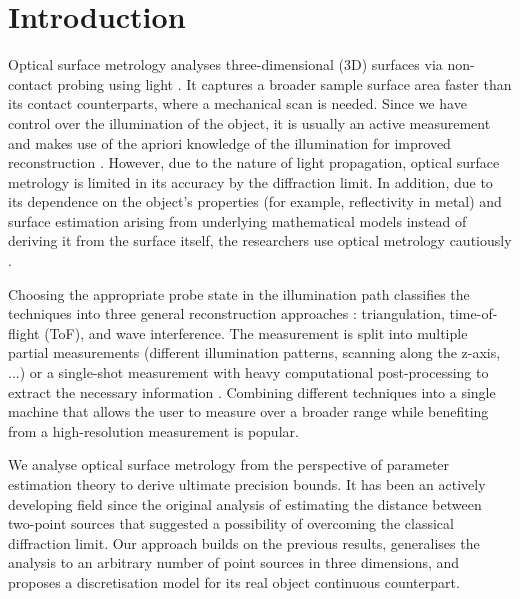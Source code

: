 \documentclass[reprint,amsmath,amssymb,aps,pra,floatfix]{revtex4-2}
\begin{document}
\maketitle

\section{\label{sec:intro} Introduction}
Optical surface metrology analyses three-dimensional (3D) surfaces via non-contact probing using light \cite{leach2020advances,catalucci2022optical}. It captures a broader sample surface area faster than its contact counterparts, where a mechanical scan is needed. Since we have control over the illumination of the object, it is usually an active measurement and makes use of the apriori knowledge of the illumination for improved reconstruction  \cite{hocken2005optical}. However, due to the nature of light propagation, optical surface metrology is limited in its accuracy by the diffraction limit. In addition, due to its dependence on the object's properties (for example, reflectivity in metal) and surface estimation arising from underlying mathematical models instead of deriving it from the surface itself, the researchers use optical metrology cautiously \cite{mathia2011recent}.

Choosing the appropriate probe state in the illumination path classifies the techniques into three general reconstruction approaches \cite{marrugo2020state}: triangulation, time-of-flight (ToF), and wave interference. The measurement is split into multiple partial measurements (different illumination patterns, scanning along the z-axis, ...) or a single-shot measurement with heavy computational post-processing to extract the necessary information \cite{yang2022single, van2019deep, wang2021single, li2016single}. Combining different techniques into a single machine that allows the user to measure over a broader range while benefiting from a high-resolution measurement is popular.

We analyse optical surface metrology from the perspective of parameter estimation theory to derive ultimate precision bounds. It has been an actively developing field since the original analysis of estimating the distance between two-point sources that suggested a possibility of overcoming the classical diffraction limit\cite{tsang2016quantum}. Our approach builds on the previous results\cite{fiderer2021general,napoli2019towards, genoni2019non}, generalises the analysis to an arbitrary number of point sources in three dimensions, and proposes a discretisation model for its real object continuous counterpart.
\end{document}
